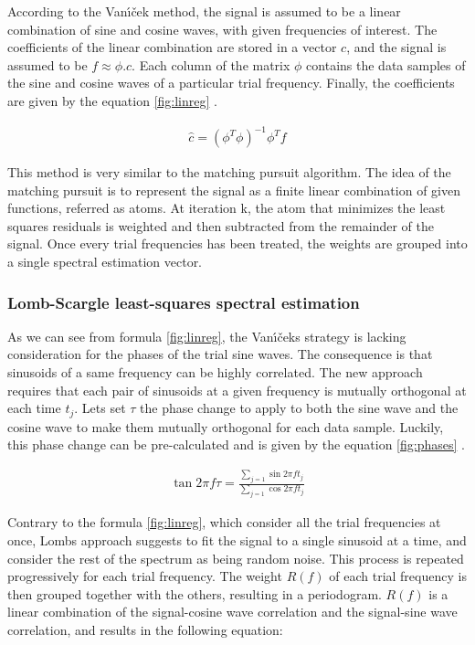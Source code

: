 \documentclass[letterpaper]{article}
\begin{document}
According to the Van\'{\i}\v{c}ek method, the signal is assumed to be a linear combination of sine and cosine waves, with given frequencies of interest.
The coefficients of the linear combination are stored in a vector $c$, and the signal is assumed to be $f \approx \phi.c$. 
Each column of the matrix $\phi$ contains the data samples of the sine and cosine waves of a particular trial frequency.
Finally, the coefficients are given by the equation \ref{fig:linreg} \citep{PS}.

\begin{align}
\hat{c} = (\phi^{T} \phi)^{-1} \phi^{T} f
\label{fig:linreg}
\end{align}

This method is very similar to the matching pursuit algorithm. The idea of the matching pursuit is to represent the signal as a finite linear combination of given
functions, referred as atoms. At iteration k, the atom that minimizes the least squares residuals is weighted and then subtracted from 
the remainder of the signal. Once every trial frequencies has been treated, the weights are grouped into a single spectral estimation vector.

\subsubsection{Lomb-Scargle least-squares spectral estimation}

As we can see from formula \ref{fig:linreg}, the Van\'{\i}\v{c}ek\textquotesingle s strategy is lacking consideration for the phases of the trial sine waves.
The consequence is that sinusoids of a same frequency can be highly correlated. The new approach requires that each pair of sinusoids at a given frequency
is mutually orthogonal at each time $t_{j}$. Let\textquotesingle s set $\tau$ the phase change to apply to both the sine wave and the cosine wave to make
them mutually orthogonal for each data sample. Luckily, this phase change can be pre-calculated and is given by the equation \ref{fig:phases} \citep{LS}.

\begin{align}
\tan 2\pi f \tau = \frac{\sum\limits_{j=1} \sin 2\pi f t_{j}}{\sum\limits_{j=1} \cos 2\pi f t_{j}}
\label{fig:phases}
\end{align}

Contrary to the formula \ref{fig:linreg}, which consider all the trial frequencies at once, Lomb\textquotesingle s approach suggests to fit the signal to a single sinusoid at a time, and consider the rest of the spectrum as being random noise. This process is repeated progressively for each trial frequency. The weight $R(f)$ of each trial frequency is then grouped together with the others, resulting in a periodogram. $R(f)$ is a linear combination of
the signal-cosine wave correlation and the signal-sine wave correlation, and results in the following equation:
\end{document}
